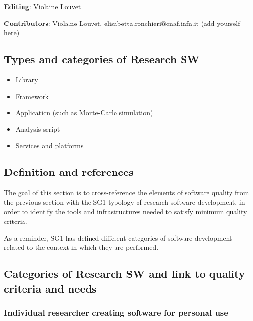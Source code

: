 \textbf{Editing}: Violaine Louvet

\textbf{Contributors}: Violaine Louvet, elisabetta.ronchieri@cnaf.infn.it (add yourself here)

\subsection{Types and categories of Research SW}

\begin{itemize}
\item Library
\item Framework
\item Application (such as Monte-Carlo simulation)
\item Analysis script
\item Services and platforms
\end{itemize}


\subsection{Definition and references}


The goal of this section is to cross-reference the elements of
software quality from the previous section with the SG1 typology of
research software development, in order to identify the tools and
infrastructures needed to satisfy minimum quality criteria. 

As a reminder, SG1 has defined different categories of software
development related to the context in which they are performed. 

\subsection{Categories of Research SW and link to quality criteria and
needs}


\subsubsection{Individual researcher creating software for personal
use} 

